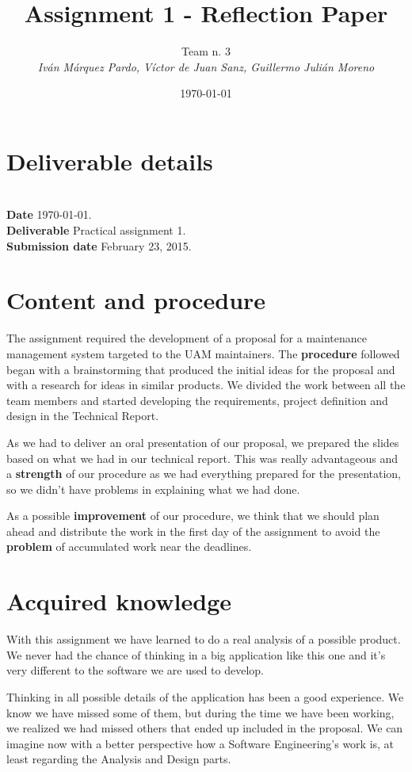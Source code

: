 \documentclass{article}
\title{Assignment 1 - Reflection Paper}
\date{\today}
\author{Team n. 3 \\ \vspace{5pt} \textit{Iván Márquez Pardo, Víctor de Juan Sanz, Guillermo Julián Moreno}}
\newcommand{\header}[1]{\\ \indent \textbf{#1}\hspace{10pt}}
\begin{document}
\maketitle
\pagestyle{plain}

\section{Deliverable details}

\noindent
\header{Date} \today.
\header{Deliverable} Practical assignment 1.
\header{Submission date} February 23, 2015.

\section{Content and procedure}

The assignment required the development of a proposal for a maintenance management system targeted to the UAM maintainers. The \textbf{procedure} followed began with a brainstorming that produced the initial ideas for the proposal and with a research for ideas in similar products. We divided the work between all the team members and started developing the requirements, project definition and design in the Technical Report.

As we had to deliver an oral presentation of our proposal, we prepared the slides based on what we had in our technical report. This was really advantageous and a \textbf{strength} of our procedure as we had everything prepared for the presentation, so we didn't have problems in explaining what we had done.

As a possible \textbf{improvement} of our procedure, we think that we should plan ahead and distribute the work in the first day of the assignment to avoid the \textbf{problem} of accumulated work near the deadlines.

\section{Acquired knowledge}

With this assignment we have learned to do a real analysis of a possible product. We never had the chance of thinking in a big application like this one and it's very different to the software we are used to develop.

Thinking in all possible details of the application has been a good experience. We know we have missed some of them, but during the time we have been working, we realized we had missed others that ended up included in the proposal. We can imagine now with a better perspective how a Software Engineering's work is, at least regarding the Analysis and Design parts.
\end{document}

